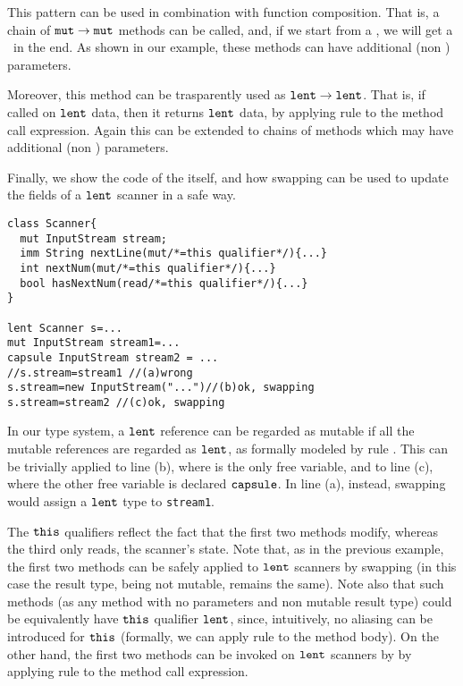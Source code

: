 {This pattern can be used in combination with function composition. That is, a chain of $\texttt{mut}\rightarrow\texttt{mut}$ methods can be called, and, if we start from a \capsule, we will get a \capsule\ in the end.
As shown in our example, these methods can have additional (non \mutable) parameters.}

{Moreover, this method can be trasparently used as $\texttt{lent}\rightarrow\texttt{lent}$. That is, if called on  $\texttt{lent}$ data, then it returns $\texttt{lent}$ data, by applying rule  to the method call expression. Again this can be extended to chains of methods which may have additional (non \mutable) parameters. }

Finally, we show the code of the \Q@Scanner@ itself, and how swapping can be used to update {the
fields of a $\texttt{lent}$ scanner in a safe way.}

\begin{lstlisting}
class Scanner{
  mut InputStream stream;
  imm String nextLine(mut/*=this qualifier*/){...}
  int nextNum(mut/*=this qualifier*/){...}
  bool hasNextNum(read/*=this qualifier*/){...}
}

lent Scanner s=...
mut InputStream stream1=...
capsule InputStream stream2 = ... 
//s.stream=stream1 //(a)wrong
s.stream=new InputStream("...")//(b)ok, swapping 
s.stream=stream2 //(c)ok, swapping 
\end{lstlisting}

In our type system,  a $\texttt{lent}$ reference can be regarded as mutable if all the mutable references are regarded as $\texttt{lent}$, as formally modeled by rule .
This can be trivially applied to line (b), where \Q@s@ is the only free variable, and to  line (c), where the other free variable is declared $\texttt{capsule}$. 
In line (a), instead, swapping would assign a $\texttt{lent}$ type to \lstinline{stream1}.

{The $\texttt{this}$ qualifiers reflect the fact that the first two methods modify, whereas the third only reads, the scanner's state. Note that, as in the previous example, the first two methods can be safely applied to $\texttt{lent}$ scanners by swapping (in this case the result type, being not mutable, remains the same). Note also that such methods (as any method with no parameters and non mutable result type) could be equivalently have $\texttt{this}$ qualifier $\texttt{lent}$, since, intuitively, no aliasing can be introduced for $\texttt{this}$ (formally, we can apply rule  to the method body). On the other hand, the first two methods can be invoked on $\texttt{lent}$ scanners by by applying rule  to the method call expression.}

